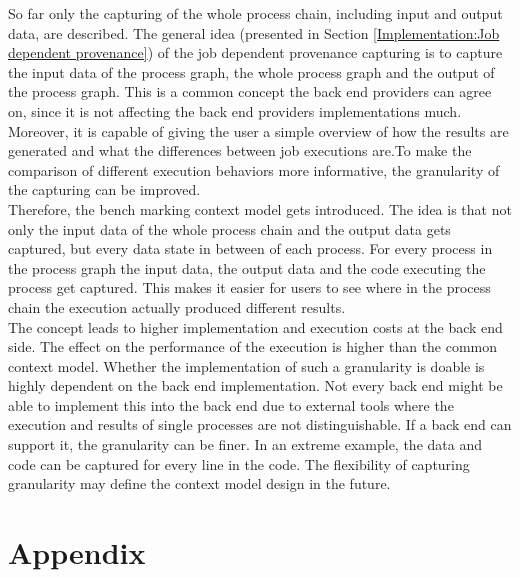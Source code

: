 \documentclass[draft,final]{vutinfth} %
\begin{document}
So far only the capturing of the whole process chain, including input and output data, are described. The general idea (presented in Section \ref{Implementation:Job dependent provenance}) of the job dependent provenance capturing is to capture the input data of the process graph, the whole process graph and the output of the process graph. This is a common concept the back end providers can agree on, since it is not affecting the back end providers implementations much. Moreover, it is capable of giving the user a simple overview of how the results are generated and what the differences between job executions are.To make the comparison of different execution behaviors more informative, the granularity of the capturing can be improved. \\
Therefore, the bench marking context model gets introduced. The idea is that not only the input data of the whole process chain and the output data gets captured, but every data state in between of each process. For every process in the process graph the input data, the output data and the code executing the process get captured. This makes it easier for users to see where in the process chain the execution actually produced different results.\\ The concept leads to higher implementation and execution costs at the back end side. The effect on the performance of the execution is higher than the common context model. Whether the implementation of such a granularity is  doable is highly dependent on the back end implementation. Not every back end might be able to implement this into the back end due to external tools where the execution and results of single processes are not distinguishable. If a back end can support it, the granularity can be finer. In an extreme example, the data and code can be captured for every line in the code. The flexibility of capturing granularity may define the context model design in the future.  

\chapter{Appendix}\label{Appendix}
\end{document}
